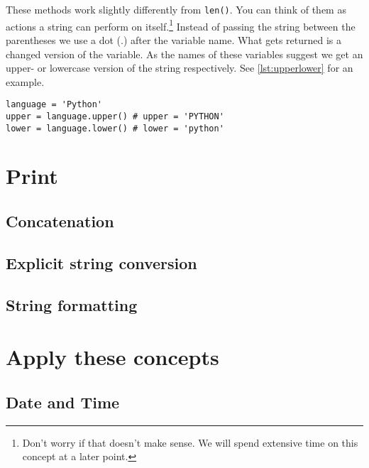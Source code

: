 	These methods work slightly differently from \lstinline|len()|.
	You can think of them as actions a string can perform on itself.\footnote{Don't worry if that doesn't make sense. We will spend extensive time on this concept at a later point.}
	Instead of passing the string between the parentheses we use a dot (.) after the variable name. 
	What gets returned is a changed version of the variable.
	As the names of these variables suggest we get an upper- or lowercase version of the string respectively.
	See \autoref{lst:upperlower} for an example.
	
	\begin{lstlisting}[caption={Getting the upper- and lowercase versions of a string.}, label={lst:upperlower}]
language = 'Python'
upper = language.upper() # upper = 'PYTHON'
lower = language.lower() # lower = 'python'
	\end{lstlisting}
	
	\section{Print}
	
		\subsection{Concatenation}
		
		\subsection{Explicit string conversion}
		
		
		\subsection{String formatting}
		
	\section{Apply these concepts}
	
		\subsection{Date and Time}
		
